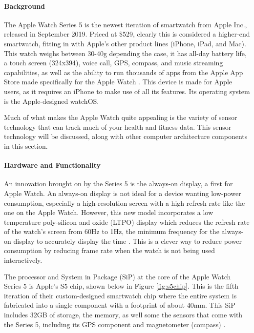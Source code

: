 \paragraph{Background}
The Apple Watch Series 5 is the newest iteration of smartwatch from Apple Inc., released in September
2019. Priced at \$529, clearly this is considered a higher-end smartwatch, fitting in with Apple's
other product lines (iPhone, iPad, and Mac). This watch weighs between 30-40g depending the case, it
has all-day battery life, a touch screen (324x394), voice call, GPS, compass, and music streaming capabilities,
as well as the ability to run thousands of apps from the Apple App Store made specifically 
for the Apple Watch \cite{apple_specs}. This device is made for Apple users, as it requires 
an iPhone to make use of all its features. Its operating system is the Apple-designed watchOS.

Much of what makes the Apple Watch quite appealing is the variety of sensor technology that can track
much of your health and fitness data. This sensor technology will be discussed, along with other
computer architecture components in this section.

\paragraph{Hardware and Functionality}
An innovation brought on by the Series 5 is the always-on display, a first for Apple Watch.
An always-on display is not ideal for a device wanting low-power consumption, especially a high-resolution
screen with a high refresh rate like the one on the Apple Watch. However, this new model incorporates
a low temperature poly-silicon and oxide (LTPO) display which reduces the refresh rate of the watch's
screen from 60Hz to 1Hz, the minimum frequency for the always-on display to accurately 
display the time \cite{apple_specs}. This is a clever way to reduce power consumption by reducing frame
rate when the watch is not being used interactively. 

The processor and System in Package (SiP) at the core of the Apple Watch Series 5 is Apple's S5 chip,
shown below in Figure \ref{fig:s5chip}. This is the fifth iteration of their custom-designed 
smartwatch chip where the entire system is fabricated into a single component with a footprint
of about 40mm. This SiP includes 32GB of storage, the memory, as well some the sensors that come with the 
Series 5, including its GPS component and magnetometer (compass) \cite{apple_specs}.


